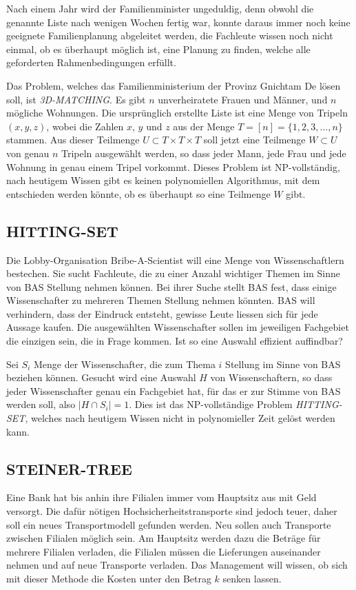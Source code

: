 Nach einem Jahr wird der Familienminister ungeduldig, denn obwohl die
genannte Liste nach wenigen Wochen fertig war, konnte daraus immer noch
keine geeignete Familienplanung abgeleitet werden, die Fachleute wissen
noch nicht einmal, ob es überhaupt möglich ist, eine Planung
zu finden, welche alle geforderten Rahmenbedingungen erfüllt.

\medskip

Das Problem, welches das Familienministerium der Provinz Gnichtam De
lösen soll, ist {\it 3D-MATCHING}. Es gibt $n$ unverheiratete Frauen
und Männer, und $n$ mögliche Wohnungen. Die ursprünglich erstellte
Liste ist eine Menge von Tripeln $(x,y,z)$, wobei die Zahlen $x$,
$y$ und $z$ aus der Menge $T=[n]=\{1,2,3,\dots,n\}$ stammen. Aus dieser
Teilmenge $U\subset T\times T\times T$ soll jetzt eine 
Teilmenge $W\subset U$ von genau $n$ Tripeln ausgewählt werden, so dass
jeder Mann, jede Frau und jede Wohnung in genau einem Tripel vorkommt.
Dieses Problem ist NP-vollständig, 
nach heutigem Wissen gibt es keinen polynomiellen Algorithmus,
mit dem entschieden werden könnte, ob es überhaupt so eine Teilmenge
$W$ gibt.

\subsection{HITTING-SET}
Die Lobby-Organisation Bribe-A-Scientist will eine Menge von
Wissenschaftlern bestechen.
Sie sucht Fachleute, die zu einer Anzahl wichtiger Themen
im Sinne von BAS Stellung nehmen können.
Bei ihrer Suche stellt BAS fest, dass einige Wissenschafter
zu mehreren Themen Stellung nehmen könnten.
BAS will verhindern, dass der Eindruck entsteht, gewisse
Leute liessen sich für jede Aussage kaufen.
Die ausgewählten Wissenschafter sollen im jeweiligen Fachgebiet
die einzigen sein, die in Frage kommen.
Ist so eine Auswahl effizient auffindbar?

\medskip

Sei $S_i$ Menge der Wissenschafter, die zum Thema $i$ Stellung im
Sinne von BAS beziehen können. Gesucht wird eine Auswahl
$H$ von Wissenschaftern, so dass jeder Wissenschafter genau
ein Fachgebiet hat, für das er zur Stimme von BAS werden soll,
also $|H\cap S_i|=1$.
Dies ist das NP-vollständige Problem {\it HITTING-SET}, welches
nach heutigem Wissen nicht in polynomieller Zeit gelöst werden
kann.


\subsection{STEINER-TREE}
Eine Bank hat bis anhin ihre Filialen immer vom Hauptsitz aus mit
Geld versorgt. Die dafür nötigen Hochsicherheitstransporte sind
jedoch teuer, daher soll ein neues Transportmodell gefunden werden.
Neu sollen auch Transporte zwischen Filialen möglich sein.
Am Hauptsitz werden dazu die Beträge für mehrere Filialen
verladen, die Filialen müssen die Lieferungen
auseinander nehmen und auf neue Transporte verladen. Das
Management will wissen, ob sich mit dieser Methode die
Kosten unter den Betrag $k$ senken lassen. 

